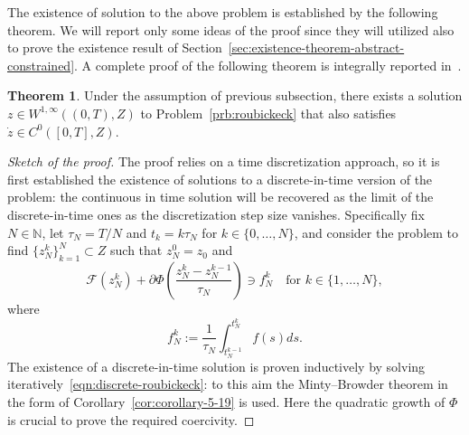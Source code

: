 \documentclass[a4paper,10pt,oneside]{amsbook}
\numberwithin{section}{chapter}
\numberwithin{equation}{chapter}
\theoremstyle{definition}
\newtheorem{thm}[prop]{Theorem}
\begin{document}
The existence of solution to the above problem is established by the following theorem. We will report only some ideas of the proof since they will utilized also to prove the existence result of Section~\ref{sec:existence-theorem-abstract-constrained}. A complete proof of the following theorem is integrally reported in~\cite[Proposition 11.1]{roubicek-pde}.
\begin{thm}
Under the assumption of previous subsection, there exists a solution $z\in W^{1,\infty}((0,T),Z)$ to Problem~\ref{prb:roubickeck} that also satisfies $\dot z\in C^0([0,T],Z)$.
\end{thm}
\begin{proof}[Sketch of the proof]
The proof relies on a time discretization approach, so it is first established the existence of solutions to a discrete-in-time version of the problem: the continuous in time solution will be recovered as the limit of the discrete-in-time ones as the discretization step size vanishes. Specifically fix $N\in\mathbb{N}$, let $\tau_N=T/N$ and $t_k=k\tau_N$ for $k\in\{0,\dots,N\}$, and consider the problem to find $\{z_N^k\}_{k=1}^N\subset Z$ such that $z_N^0=z_0$ and
\begin{equation}
\label{eqn:discrete-roubickeck}
\mathcal{F}(z_N^k)+\partial\Phi\left(\frac{z_N^k-z_N^{k-1}}{\tau_N}\right)\ni f_N^k\quad\text{for $k\in\{1,\dots,N\}$},
\end{equation}
where
\[
f_N^k:=\frac{1}{\tau_N}\int_{t_N^{k-1}}^{t_N^k}f(s)ds.
\]
The existence of a discrete-in-time solution is proven inductively by solving iteratively~\eqref{eqn:discrete-roubickeck}: to this aim the Minty--Browder theorem in the form of Corollary~\ref{cor:corollary-5-19} is used. Here the quadratic growth of $\Phi$ is crucial to prove the required coercivity.


\end{proof}
\end{document}

